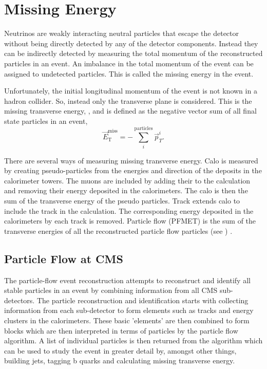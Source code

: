 \section{Missing Energy} 
Neutrinos are weakly interacting neutral particles that escape the
detector without being directly detected by any of the detector components. 
Instead they can be indirectly detected by measuring the total momentum of the
reconstructed particles in an event.
An imbalance in the total momentum of the event can be assigned to undetected
particles. This is called the missing energy in the event.

Unfortunately, the initial longitudinal momentum of the event is not known in a
hadron collider. So, instead only the transverse plane is
considered. This is the missing transverse energy, \ETm, and is defined as
the negative vector sum of all final state particles in an event,
\begin{equation}
\vec{E}^{\text{miss}}_{\text{T}} = -\sum_i^{\text{particles}} \vec{p}_{T}^{i}.
\end{equation}

There are several ways of measuring missing transverse energy.
Calo \ETm is measured by creating pseudo-particles from the energies and
direction of the deposits in the calorimeter towers. The muons are included by
adding their \Pt to the calculation and removing their energy deposited in the
calorimeters. The calo \ETm is then the sum of the transverse energy of the
pseudo particles.
Track \ETm extends calo \ETm to include the track \Pt in the calculation.  The
corresponding energy deposited in the calorimeters by each track is removed.
Particle flow \ETm (PFMET) is the sum of the transverse energies of all the
reconstructed particle flow particles (see ) \cite{PF}.

\subsection{Particle Flow at CMS}
\label{sec:pf}

The particle-flow event reconstruction attempts to reconstruct and identify all
stable particles in an event by combining information from all CMS
sub-detectors. The particle reconstruction and identification starts with
collecting information from each sub-detector to form elements such as tracks
and energy clusters in the calorimeters. These basic 'elements' are then
combined to form blocks which are then interpreted in terms of particles by the
particle flow algorithm. A list of individual particles is then returned from
the algorithm which can be used to study the event in greater detail by,
amongst other things, building jets, tagging b quarks and calculating missing
transverse energy\cite{PF}.

